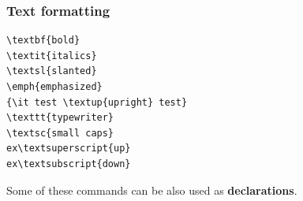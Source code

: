 \begin{frame}[fragile]
\frametitle{Text formatting}


\begin{multicols}{2}
	
\begin{lstlisting}
\textbf{bold} 
\textit{italics}
\textsl{slanted} 
\emph{emphasized} 
{\it test \textup{upright} test}
\texttt{typewriter} 
\textsc{small caps} 
ex\textsuperscript{up} 
ex\textsubscript{down} 
\end{lstlisting}
	
	
\end{multicols}

Some of these commands can be also used as \textbf{declarations}. 
\end{frame}


